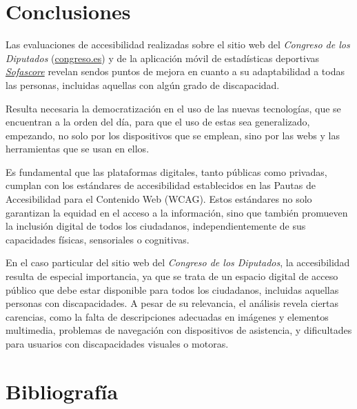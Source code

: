 \documentclass[]{article}
\begin{document}
\newpage

\section{Conclusiones}

Las evaluaciones de accesibilidad realizadas sobre el sitio web del \textit{Congreso de los Diputados} (\href{https://www.congreso.es/es/home}{congreso.es}) y de la aplicación móvil de estadísticas deportivas \textit{\href{https://play.google.com/store/apps/details?id=com.sofascore.results&pcampaignid=web_share}{Sofascore}} revelan sendos puntos de mejora en cuanto a su adaptabilidad a todas las personas, incluidas aquellas con algún grado de discapacidad.

Resulta necesaria la democratización en el uso de las nuevas tecnologías, que se encuentran a la orden del día, para que el uso de estas sea generalizado, empezando, no solo por los dispositivos que se emplean, sino por las webs y las herramientas que se usan en ellos.

Es fundamental que las plataformas digitales, tanto públicas como privadas, cumplan con los estándares de accesibilidad establecidos en las Pautas de Accesibilidad para el Contenido Web (WCAG). Estos estándares no solo garantizan la equidad en el acceso a la información, sino que también promueven la inclusión digital de todos los ciudadanos, independientemente de sus capacidades físicas, sensoriales o cognitivas.

En el caso particular del sitio web del \textit{Congreso de los Diputados}, la accesibilidad resulta de especial importancia, ya que se trata de un espacio digital de acceso público que debe estar disponible para todos los ciudadanos, incluidas aquellas personas con discapacidades. A pesar de su relevancia, el análisis revela ciertas carencias, como la falta de descripciones adecuadas en imágenes y elementos multimedia, problemas de navegación con dispositivos de asistencia, y dificultades para usuarios con discapacidades visuales o motoras.

\newpage

\section{Bibliografía}
\end{document}
